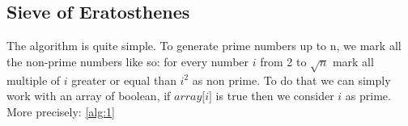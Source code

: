 
\subsection{Sieve of Eratosthenes}

The algorithm is quite simple. To generate prime numbers up to n, we mark all the non-prime numbers like so: for every number $\textit{i}$ from 2 to $\sqrt{n}$ mark all multiple of $\textit{i}$ greater or equal than $\textit{i}^{2}$ as non prime. To do that we can simply work with an array of boolean, if $\textit{array[i]}$ is true then we consider $\textit{i}$ as prime.\\More precisely: \ref{alg:1}











